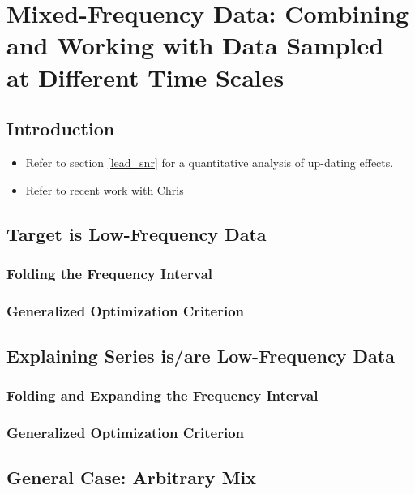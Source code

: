 \documentclass[a4paper]{book}
\begin{document}
\chapter{Mixed-Frequency Data: Combining and Working with Data Sampled at Different Time Scales}
\label{chap:mix}

\section{Introduction}

\begin{itemize}
\item Refer to section \ref{lead_snr} for a quantitative analysis of up-dating effects.
\item Refer to recent work with Chris
\end{itemize}


\section{Target is Low-Frequency Data}


\subsection{Folding the Frequency Interval}

\subsection{Generalized Optimization Criterion}

\section{Explaining Series is/are Low-Frequency Data}

\subsection{Folding and Expanding the Frequency Interval}

\subsection{Generalized Optimization Criterion}

\section{General Case: Arbitrary Mix}
\end{document}
